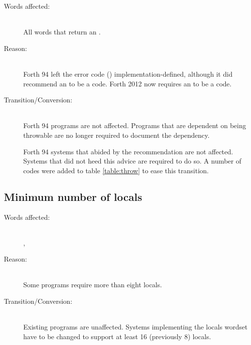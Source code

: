 \begin{description}
\item[Words affected:] ~\\
	All words that return an .

\item[Reason:] ~\\
	Forth 94 left the error code () implementation-defined,
	although it did recommend an  to be a 
	code.  Forth 2012 now requires an  to be a
	 code.

\item[Transition/Conversion:] ~\\
	Forth 94 programs are not affected.  Programs that are dependent
	on  being throwable are no longer required to document
	the dependency.

	Forth 94 systems that abided by the recommendation are not affected.
	Systems that did not heed this advice are required to do so. A
	number of  codes were added to table
	\ref{table:throw} to ease this transition.
\end{description}


\subsection{Minimum number of locals} %
\label{diff:12:locals}

\begin{description}
\item[Words affected:] ~\\
	, 

\item[Reason:] ~\\
	Some programs require more than eight locals.
 
\item[Transition/Conversion:] ~\\
	Existing programs are unaffected.  Systems implementing the locals
	wordset have to be changed to support at least 16 (previously 8)
	locals.
\end{description}


